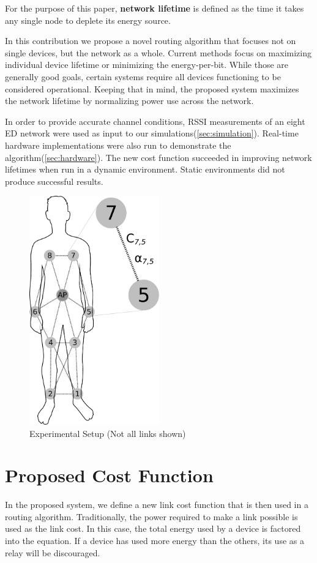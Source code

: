 \documentclass{article}
\begin{document}
For the purpose of this paper, \textbf{network lifetime} is defined as the time it takes any single node to deplete its energy source. 

In this contribution we propose a novel routing algorithm that focuses not on single devices, but the network as a whole. Current methods focus on maximizing individual device lifetime or minimizing the energy-per-bit. While those are generally good goals, certain systems require all devices functioning to be considered operational. Keeping that in mind, the proposed system maximizes the network lifetime by normalizing power use across the network.

In order to provide accurate channel conditions, RSSI measurements of an eight ED network were used as input to our simulations(\ref{sec:simulation}). Real-time hardware implementations were also run to demonstrate the algorithm(\ref{sec:hardware}). The new cost function succeeded in improving network lifetimes when run in a dynamic environment. Static environments did not produce successful results.

\begin{figure}[!htb]
\begin{center}
\includegraphics[width=0.5\textwidth]{figures/body.pdf}
\end{center}
\caption{Experimental Setup (Not all links shown)}
\label{fig:body}
\end{figure}

\section{Proposed Cost Function}
In the proposed system, we define a new link cost function that is then used in a routing algorithm. Traditionally, the power required to make a link possible is used as the link cost. In this case, the total energy used by a device is factored into the equation. If a device has used more energy than the others, its use as a relay will be discouraged.
\end{document}
